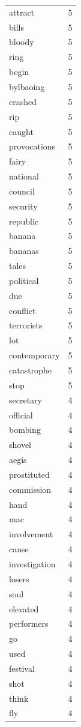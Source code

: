 \begin{tabular}{lr}
attract & 5 \\
bills & 5 \\
bloody & 5 \\
ring & 5 \\
begin & 5 \\
bylbaoing & 5 \\
crashed & 5 \\
rip & 5 \\
caught & 5 \\
provocations & 5 \\
fairy & 5 \\
national & 5 \\
council & 5 \\
security & 5 \\
republic & 5 \\
banana & 5 \\
bananas & 5 \\
tales & 5 \\
political & 5 \\
due & 5 \\
conflict & 5 \\
terrorists & 5 \\
lot & 5 \\
contemporary & 5 \\
catastrophe & 5 \\
stop & 5 \\
secretary & 4 \\
official & 4 \\
bombing & 4 \\
shovel & 4 \\
aegis & 4 \\
prostituted & 4 \\
commission & 4 \\
hand & 4 \\
mac & 4 \\
involvement & 4 \\
cause & 4 \\
investigation & 4 \\
losers & 4 \\
soul & 4 \\
elevated & 4 \\
performers & 4 \\
go & 4 \\
used & 4 \\
festival & 4 \\
shot & 4 \\
think & 4 \\
fly & 4 \\

\end{tabular}
